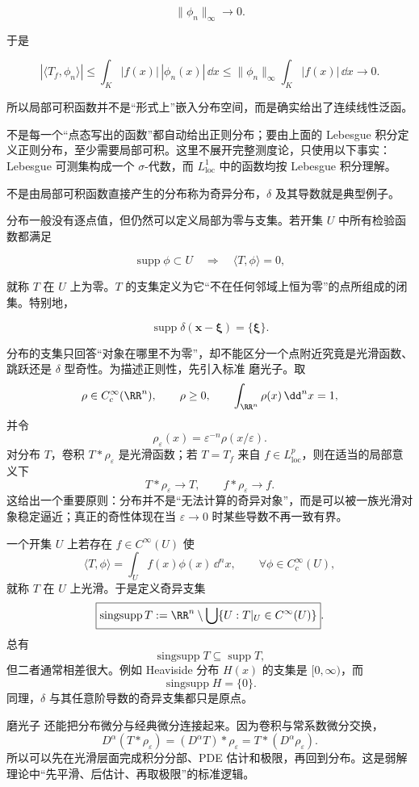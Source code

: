 \[
\|\phi_n\|_\infty\to0.
\]

于是

\[
|\langle T_f,\phi_n\rangle|
\le\int_K|f(x)|\,|\phi_n(x)|\,\dd x
\le\|\phi_n\|_\infty\int_K|f(x)|\,\dd x\to0.
\]

所以局部可积函数并不是``形式上''嵌入分布空间，而是确实给出了连续线性泛函。

不是每一个``点态写出的函数''都自动给出正则分布；要由上面的 Lebesgue 积分定义正则分布，至少需要局部可积。这里不展开完整测度论，只使用以下事实：Lebesgue 可测集构成一个 $\sigma$-代数，而 $L^1_{\mathrm{loc}}$ 中的函数均按 Lebesgue 积分理解。

不是由局部可积函数直接产生的分布称为奇异分布，$\delta$ 及其导数就是典型例子。

分布一般没有逐点值，但仍然可以定义局部为零与支集。若开集 $U$ 中所有检验函数都满足

\[
\operatorname{supp}\phi\subset U
\quad\Longrightarrow\quad
\langle T,\phi\rangle=0,
\]

就称 $T$ 在 $U$ 上为零。$T$ 的支集定义为它``不在任何邻域上恒为零''的点所组成的闭集。特别地，

\[
\operatorname{supp}\delta(\mathbf x-\boldsymbol\xi)=\{\boldsymbol\xi\}.
\]

分布的支集只回答``对象在哪里不为零''，却不能区分一个点附近究竟是光滑函数、跳跃还是 $\delta$ 型奇性。为描述正则性，先引入标准 磨光子。取
\[
\rho\in C_c^\infty(\RR^n),
\qquad
\rho\ge0,
\qquad
\int_{\RR^n}\rho(x)\,\dd^n x=1,
\]
并令
\[
\rho_\varepsilon(x)=\varepsilon^{-n}\rho(x/\varepsilon).
\]
对分布 $T$，卷积 $T*\rho_\varepsilon$ 是光滑函数；若 $T=T_f$ 来自 $f\in L^p_{\mathrm{loc}}$，则在适当的局部意义下
\[
T*\rho_\varepsilon\longrightarrow T,
\qquad
f*\rho_\varepsilon\longrightarrow f.
\]
这给出一个重要原则：分布并不是``无法计算的奇异对象''，而是可以被一族光滑对象稳定逼近；真正的奇性体现在当 $\varepsilon\to0$ 时某些导数不再一致有界。

一个开集 $U$ 上若存在 $f\in C^\infty(U)$ 使
\[
\langle T,\phi\rangle
=\int_U f(x)\phi(x)\,\dd^n x,
\qquad
\forall\phi\in C_c^\infty(U),
\]
就称 $T$ 在 $U$ 上光滑。于是定义奇异支集
\[
\boxed{
\operatorname{singsupp}T
:=
\RR^n\setminus
\bigcup\{U:T|_U\in C^\infty(U)\}
}.
\]
总有
\[
\operatorname{singsupp}T\subseteq\operatorname{supp}T,
\]
但二者通常相差很大。例如 Heaviside 分布 $H(x)$ 的支集是 $[0,\infty)$，而
\[
\operatorname{singsupp}H=\{0\}.
\]
同理，$\delta$ 与其任意阶导数的奇异支集都只是原点。

磨光子 还能把分布微分与经典微分连接起来。因为卷积与常系数微分交换，
\[
D^\alpha(T*\rho_\varepsilon)
=(D^\alpha T)*\rho_\varepsilon
=T*(D^\alpha\rho_\varepsilon).
\]
所以可以先在光滑层面完成积分分部、PDE 估计和极限，再回到分布。这是弱解理论中``先平滑、后估计、再取极限''的标准逻辑。

